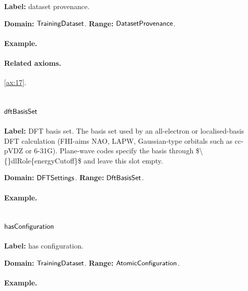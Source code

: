 \textbf{Label:} dataset provenance.

\textbf{Domain:} $\mathsf{TrainingDataset}$.
\textbf{Range:} $\mathsf{DatasetProvenance}$.

\paragraph{Example.}

\paragraph{Related axioms.} \eqref{ax:17}.

\subsection{$\mathsf{dftBasisSet}$}
\label{sec:term-dftBasisSet}

\textbf{Label:} DFT basis set.
The basis set used by an all-electron or localised-basis DFT calculation (FHI-aims NAO, LAPW, Gaussian-type orbitals such as cc-pVDZ or 6-31G). Plane-wave codes specify the basis through \$\textbackslash\{\}dlRole\{energyCutoff\}\$ and leave this slot empty.

\textbf{Domain:} $\mathsf{DFTSettings}$.
\textbf{Range:} $\mathsf{DftBasisSet}$.

\paragraph{Example.}

\subsection{$\mathsf{hasConfiguration}$}
\label{sec:term-hasConfiguration}

\textbf{Label:} has configuration.

\textbf{Domain:} $\mathsf{TrainingDataset}$.
\textbf{Range:} $\mathsf{AtomicConfiguration}$.

\paragraph{Example.}

